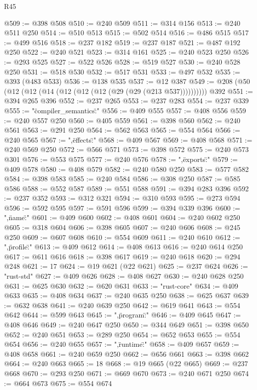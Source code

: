 \begin{lexlean}{R45}
\begin{coremodule}
@509 := @398 @508
@510 := @240 @509
@511 := @314 @156
@513 := @240 @511 @250
@514 := @510 @513
@515 := @502 @514
@516 := @486 @515
@517 := @499 @516
@518 := @237 @182
@519 := @237 @187
@521 := @487 @192 @250
@522 := @240 @521
@523 := @314 @161
@525 := @240 @523 @250
@526 := @293 @525
@527 := @522 @526
@528 := @519 @527
@530 := @240 @528 @250
@531 := @518 @530
@532 := @517 @531
@533 := @497 @532
@535 := @393 (@483 @533)
@536 := @138 @535
@537 := @12 @387
@549 := @208 (@50 (@12 (@12 (@14 (@12 (@12 (@12 (@29 (@29 (@213 @537)))))))))) @392
@551 := @394 @265 @396
@552 := @237 @265
@553 := @237 @283
@554 := @237 @339
@555 := "{\"compiler_semantics\":"
@556 := @409 @555
@557 := @408 @556
@559 := @240 @557 @250
@560 := @405 @559
@561 := @398 @560
@562 := @240 @561
@563 := @291 @250
@564 := @562 @563
@565 := @554 @564
@566 := @240 @565
@567 := ",\"effects\":"
@568 := @409 @567
@569 := @408 @568
@571 := @240 @569 @250
@572 := @566 @571
@573 := @398 @572
@575 := @240 @573 @301
@576 := @553 @575
@577 := @240 @576
@578 := ",\"exports\":"
@579 := @409 @578
@580 := @408 @579
@582 := @240 @580 @250
@583 := @577 @582
@584 := @398 @583
@585 := @240 @584
@586 := @308 @250
@587 := @585 @586
@588 := @552 @587
@589 := @551 @588
@591 := @394 @283 @396
@592 := @237 @352
@593 := @312 @321
@594 := @310 @593
@595 := @273 @594
@596 := @592 @595
@597 := @591 @596
@599 := @394 @339 @396
@600 := ",\"name\":"
@601 := @409 @600
@602 := @408 @601
@604 := @240 @602 @250
@605 := @318 @604
@606 := @398 @605
@607 := @240 @606
@608 := @245 @250
@609 := @607 @608
@610 := @554 @609
@611 := @240 @610
@612 := ",\"profile\":"
@613 := @409 @612
@614 := @408 @613
@616 := @240 @614 @250
@617 := @611 @616
@618 := @398 @617
@619 := @240 @618
@620 := @294 @248
@621 := 17
@624 := @19 @621 (@22 @621)
@625 := @237 @624
@626 := "rust-std"
@627 := @409 @626
@628 := @408 @627
@630 := @240 @628 @250
@631 := @625 @630
@632 := @620 @631
@633 := "rust-core"
@634 := @409 @633
@635 := @408 @634
@637 := @240 @635 @250
@638 := @625 @637
@639 := @632 @638
@641 := @240 @639 @250
@642 := @619 @641
@643 := @554 @642
@644 := @599 @643
@645 := ",\"program\":"
@646 := @409 @645
@647 := @408 @646
@649 := @240 @647 @250
@650 := @344 @649
@651 := @398 @650
@652 := @240 @651
@653 := @289 @250
@654 := @652 @653
@655 := @554 @654
@656 := @240 @655
@657 := ",\"runtime\":"
@658 := @409 @657
@659 := @408 @658
@661 := @240 @659 @250
@662 := @656 @661
@663 := @398 @662
@664 := @240 @663
@665 := 18
@668 := @19 @665 (@22 @665)
@669 := @237 @668
@670 := @293 @250
@671 := @669 @670
@673 := @240 @671 @250
@674 := @664 @673
@675 := @554 @674
}
\end{coremodule}
\end{lexlean}
